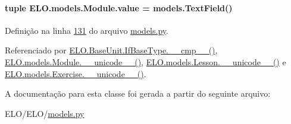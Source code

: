 \paragraph[{value}]{\setlength{\rightskip}{0pt plus 5cm}tuple E\+L\+O.\+models.\+Module.\+value = models.\+Text\+Field()\hspace{0.3cm}{\ttfamily [static]}}\label{classELO_1_1models_1_1Module_a5b31cea93dea5474f3ff974cd745e39f}


Definição na linha \hyperlink{ELO_2models_8py_source_l00131}{131} do arquivo \hyperlink{ELO_2models_8py_source}{models.\+py}.



Referenciado por \hyperlink{classELO_1_1BaseUnit_1_1IfBaseType_a22d6f30c4d9504a9c20d0ff5a538544d}{E\+L\+O.\+Base\+Unit.\+If\+Base\+Type.\+\_\+\+\_\+cmp\+\_\+\+\_\+()}, \hyperlink{classELO_1_1models_1_1Module_a8fc9fadf09fa7b3bbcfea69ebe25d278}{E\+L\+O.\+models.\+Module.\+\_\+\+\_\+unicode\+\_\+\+\_\+()}, \hyperlink{classELO_1_1models_1_1Lesson_a53e265de97c6b73f262f62a80f9ca994}{E\+L\+O.\+models.\+Lesson.\+\_\+\+\_\+unicode\+\_\+\+\_\+()} e \hyperlink{classELO_1_1models_1_1Exercise_a23f81c66e4d6bc5a4582d74d191f5117}{E\+L\+O.\+models.\+Exercise.\+\_\+\+\_\+unicode\+\_\+\+\_\+()}.



A documentação para esta classe foi gerada a partir do seguinte arquivo\+:\begin{DoxyCompactItemize}
\item 
E\+L\+O/\+E\+L\+O/\hyperlink{ELO_2models_8py}{models.\+py}\end{DoxyCompactItemize}
